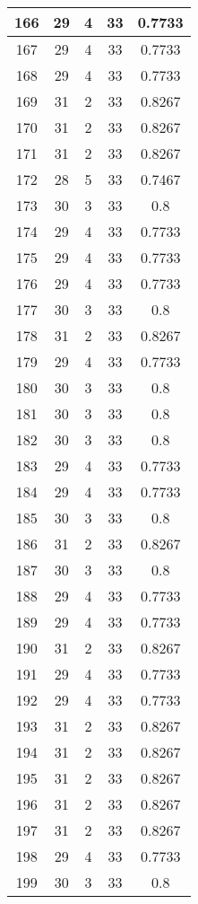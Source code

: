 \documentclass[letterpaper, 12pt]{article}
\begin{document}
\begin{longtable}{|c|c|c|c|c|}
\hline
166 & 29 & 4 & 33 & 0.7733 \\
\hline
167 & 29 & 4 & 33 & 0.7733 \\
\hline
168 & 29 & 4 & 33 & 0.7733 \\
\hline
169 & 31 & 2 & 33 & 0.8267 \\
\hline
170 & 31 & 2 & 33 & 0.8267 \\
\hline
171 & 31 & 2 & 33 & 0.8267 \\
\hline
172 & 28 & 5 & 33 & 0.7467 \\
\hline
173 & 30 & 3 & 33 & 0.8 \\
\hline
174 & 29 & 4 & 33 & 0.7733 \\
\hline
175 & 29 & 4 & 33 & 0.7733 \\
\hline
176 & 29 & 4 & 33 & 0.7733 \\
\hline
177 & 30 & 3 & 33 & 0.8 \\
\hline
178 & 31 & 2 & 33 & 0.8267 \\
\hline
179 & 29 & 4 & 33 & 0.7733 \\
\hline
180 & 30 & 3 & 33 & 0.8 \\
\hline
181 & 30 & 3 & 33 & 0.8 \\
\hline
182 & 30 & 3 & 33 & 0.8 \\
\hline
183 & 29 & 4 & 33 & 0.7733 \\
\hline
184 & 29 & 4 & 33 & 0.7733 \\
\hline
185 & 30 & 3 & 33 & 0.8 \\
\hline
186 & 31 & 2 & 33 & 0.8267 \\
\hline
187 & 30 & 3 & 33 & 0.8 \\
\hline
188 & 29 & 4 & 33 & 0.7733 \\
\hline
189 & 29 & 4 & 33 & 0.7733 \\
\hline
190 & 31 & 2 & 33 & 0.8267 \\
\hline
191 & 29 & 4 & 33 & 0.7733 \\
\hline
192 & 29 & 4 & 33 & 0.7733 \\
\hline
193 & 31 & 2 & 33 & 0.8267 \\
\hline
194 & 31 & 2 & 33 & 0.8267 \\
\hline
195 & 31 & 2 & 33 & 0.8267 \\
\hline
196 & 31 & 2 & 33 & 0.8267 \\
\hline
197 & 31 & 2 & 33 & 0.8267 \\
\hline
198 & 29 & 4 & 33 & 0.7733 \\
\hline
199 & 30 & 3 & 33 & 0.8 \\
\hline
\end{longtable}
\end{document}

